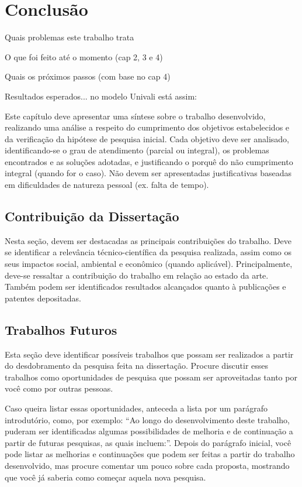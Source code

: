 \chapter{Conclusão}
\label{c_conclusao}

Quais problemas este trabalho trata

O que foi feito até o momento (cap 2, 3 e 4)

Quais os próximos passos (com base no cap 4)

Resultados esperados... no modelo Univali está assim:

Este capítulo deve apresentar uma síntese sobre o trabalho desenvolvido, realizando uma análise a respeito do cumprimento dos objetivos estabelecidos e da verificação da hipótese de pesquisa inicial. Cada objetivo deve ser analisado, identificando-se o grau de atendimento (parcial ou integral), os problemas encontrados e as soluções adotadas, e justificando o porquê do não cumprimento integral (quando for o caso). Não devem ser apresentadas justificativas baseadas em dificuldades de natureza pessoal (ex. falta de tempo).


\section{Contribuição da Dissertação}
\label{c_conclusao-contribuicao}

Nesta seção, devem ser destacadas as principais contribuições do trabalho. Deve se identificar a relevância técnico-científica da pesquisa realizada, assim como os seus impactos social, ambiental e econômico (quando aplicável). Principalmente, deve-se ressaltar a contribuição do trabalho em relação ao estado da arte. Também podem ser identificados resultados alcançados quanto à publicações e patentes depositadas.


\section{Trabalhos Futuros}
\label{c_conclusao-trabalhos-futuros}

Esta seção deve identificar possíveis trabalhos que possam ser realizados a partir do desdobramento da pesquisa feita na dissertação. Procure discutir esses trabalhos como oportunidades de pesquisa que possam ser aproveitadas tanto por você como por outras pessoas.

Caso queira listar essas oportunidades, anteceda a lista por um parágrafo introdutório, como, por exemplo: “Ao longo do desenvolvimento deste trabalho, puderam ser identificadas algumas possibilidades de melhoria e de continuação a partir de futuras pesquisas, as quais incluem:”. Depois do parágrafo inicial, você pode listar as melhorias e continuações que podem ser feitas a partir do trabalho desenvolvido, mas procure comentar um pouco sobre cada proposta, mostrando que você já saberia como começar aquela nova pesquisa.

